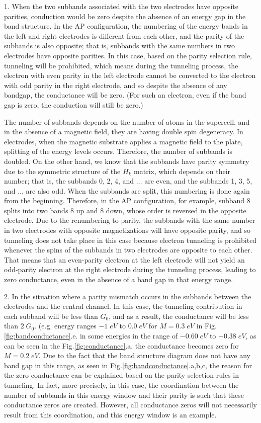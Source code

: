 \documentclass[twoside,twocolumn,9pt]{article}
\begin{document}
1. When the two subbands associated with the two electrodes have opposite parities, conduction would be zero despite the absence of an energy gap in the band structure. In the AP configuration, the numbering of the energy bands in the left and right electrodes is different from each other, and the parity of the subbands is also opposite; that is, subbands with the same numbers in two electrodes have opposite parities. In this case, based on the parity selection rule, tunneling will be prohibited, which means during the tunneling process, the electron with even parity in the left electrode cannot be converted to the electron with odd parity in the right electrode, and so despite the absence of any bandgap, the conductance will be zero. (For such an electron, even if the band gap is zero, the conduction will still be zero.)

The number of subbands depends on the number of atoms in the supercell, and in the absence of a magnetic field, they are having double spin degeneracy. In electrodes, when the magnetic substrate applies a magnetic field to the plate, splitting of the energy levels occurs. Therefore, the number of subbands is doubled. On the other hand, we know that the subbands have parity symmetry due to the symmetric structure of the $H_k$ matrix, which depends on their number; that is, the subbands 0, 2, 4, and $\dots$ are even, and the subbands 1, 3, 5, and $\dots$ are also odd. When the subbands are split, this numbering is done again from the beginning. Therefore, in the AP configuration, for example, subband 8 splits into two bands 8 up and 8 down, whose order is reversed in the opposite electrode. Due to the renumbering to parity, the subbands with the same number in two electrodes with opposite magnetizations will have opposite parity, and so tunneling does not take place in this case because electron tunneling is prohibited whenever the spins of the subbands in two electrodes are opposite to each other. That means that an even-parity electron at the left electrode will not yield an odd-parity electron at the right electrode during the tunneling process, leading to zero conductance, even in the absence of a band gap in that energy range.

2. In the situation where a parity mismatch occurs in the subbands between the electrodes and the central channel. In this case, the tunneling contribution in each subband will be less than $G_0$, and as a result, the conductance will be less than $2\;G_0$. (e.g. energy ranges $-1\;eV$ to $0.0\;eV$ for $M= 0.3\;eV$ in Fig.\ref{fig:bandconductance}.e. in some energies in the range of $-0.60\;eV$ to $-0.38\;eV$, as can be seen in the Fig.\ref{fig:conductance}.a, the conductance becomes zero for $M=0.2\;eV$. Due to the fact that the band structure diagram does not have any band gap in this range, as seen in Fig.\ref{fig:bandconductance}.a,b,c, the reason for the zero conductance can be explained based on the parity selection rules in tunneling. In fact, more precisely, in this case, the coordination between the number of subbands in this energy window and their parity is such that these conductance zeros are created. However, all conductance zeros will not necessarily result from this coordination, and this energy window is an example.
\end{document}
